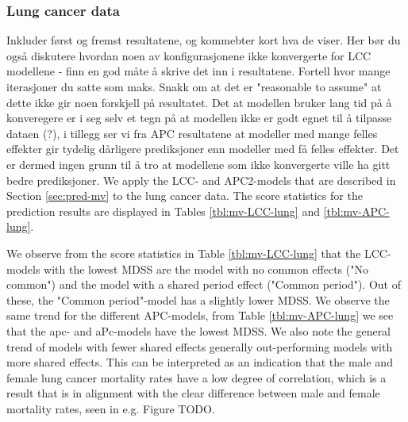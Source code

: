 \subsubsection{Lung cancer data}
\textcolor{myDarkGreen}{
Inkluder først og fremst resultatene, og kommebter kort hva de viser. Her bør du også diskutere hvordan noen av konfigurasjonene ikke konvergerte for LCC modellene - finn en god måte å skrive det inn i resultatene. Fortell hvor mange iterasjoner du satte som maks. Snakk om at det er "reasonable to assume" at dette ikke gir noen forskjell på resultatet. Det at modellen bruker lang tid på å konveregere er i seg selv et tegn på at modellen ikke er godt egnet til å tilpasse dataen (?), i tillegg ser vi fra APC resultatene at modeller med mange felles effekter gir tydelig dårligere prediksjoner enn modeller med få felles effekter. Det er dermed ingen grunn til å tro at modellene som ikke konvergerte ville ha gitt bedre prediksjoner. 
}
We apply the LCC- and APC2-models that are described in Section \ref{sec:pred-mv} to the lung cancer data. The score statistics for the prediction results are displayed in Tables \ref{tbl:mv-LCC-lung} and \ref{tbl:mv-APC-lung}. 

\newpar We observe from the score statistics in Table \ref{tbl:mv-LCC-lung} that the LCC-models with the lowest MDSS are the model with no common effects ("No common") and the model with a shared period effect ("Common period"). Out of these, the "Common period"-model has a slightly lower MDSS. We observe the same trend for the different APC-models, from Table \ref{tbl:mv-APC-lung} we see that the apc- and aPc-models have the lowest MDSS. We also note the general trend of models with fewer shared effects generally out-performing models with more shared effects. This can be interpreted as an indication that the male and female lung cancer mortality rates have a low degree of correlation, which is a result that is in alignment with the clear difference between male and female mortality rates, seen in e.g. Figure \textcolor{myDarkGreen}{TODO}. 

